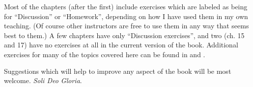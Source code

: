 \begin{refsection}
Most of the chapters (after the first) include exercises which are labeled as being for “Discussion” or “Homework”, depending on how I have used them in my own teaching. (Of course other instructors are free to use them in any way that seems best to them.) A few chapters have only “Discussion exercises”, and two (ch. 15 and 17) have no exercises at all in the current version of the book. Additional exercises for many of the topics covered here can be found in \citet{Saeed2009} and \citet{Kearns2000}.



Suggestions which will help to improve any aspect of the book will be most welcome. \textit{Soli Deo Gloria}.

\printbibliography[heading=subbibliography]
\end{refsection}

